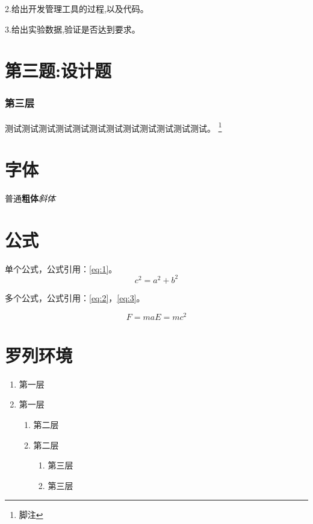 \documentclass[format=draft,language=chinese,category=SDN]{hustreport}
\begin{document}
2.给出开发管理工具的过程,以及代码。

3.给出实验数据,验证是否达到要求。

\section{第三题:设计题}\label{sec:Q3}

\subsubsection{第三层}\label{sec:3}
测试测试测试测试测试测试测试测试测试测试测试测试。
\footnote{\label{footnote:1}脚注}

\section{字体}

普通\textbf{粗体}\emph{斜体}


\section{公式}

单个公式，公式引用：\autoref{eq:1}。
\begin{equation}
 c^2 = a^2 + b^2 \label{eq:1}
\end{equation}

多个公式，公式引用：\autoref{eq:2}，\autoref{eq:3}。

\begin{subequations}
\begin{equation}
  F = ma \label{eq:2}
\end{equation}
\begin{equation}
  E = mc^2 \label{eq:3}
\end{equation}
\end{subequations}

\section{罗列环境}

\begin{enumerate}
    \item 第一层\label{item:1}
    \item 第一层
    \begin{enumerate}
        \item 第二层\label{item:2}
        \item 第二层
        \begin{enumerate}
            \item 第三层\label{item:3}
            \item 第三层
        \end{enumerate}
    \end{enumerate}
\end{enumerate}
\end{document}
